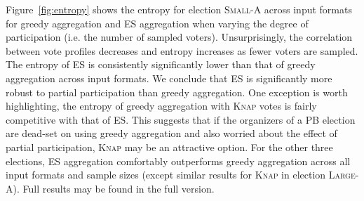 \documentclass[letterpaper]{article} %
\newcommand{\points}{\textsc{Points}}
\newcommand{\knap}{\textsc{Knap}}
\newcommand{\mes}{ES}
\begin{document}
 








Figure~\ref{fig:entropy} shows the entropy for election   \textsc{Small-A} across   input formats for greedy aggregation and  \mes{} aggregation when varying the degree of participation (i.e. the number of sampled voters). 
Unsurprisingly, the correlation between vote profiles decreases and entropy increases  as fewer voters are sampled. 
The entropy of \mes{} is consistently significantly lower than that of greedy aggregation across input formats. We conclude that \mes{} is significantly more robust to partial participation than greedy aggregation. One exception is worth highlighting, the entropy of greedy aggregation with \knap{} votes is fairly competitive with that of \mes. This suggests that if the organizers of a PB election are dead-set on using greedy aggregation and also worried about the effect of partial participation,  \knap{} may be an attractive option.  
%
For the other three elections,   \mes{} aggregation comfortably outperforms greedy aggregation across all input formats and sample sizes (except similar results for \knap{} in election \textsc{Large-A}). Full results  may be found in the full version. 
\end{document}

